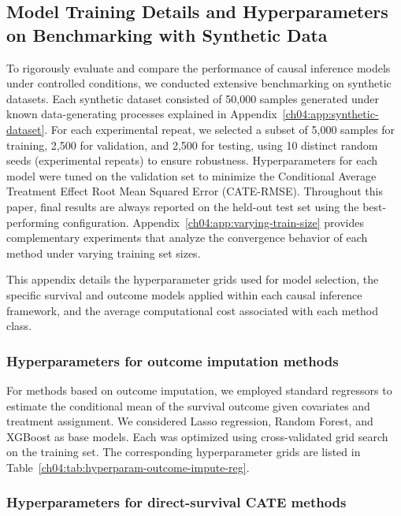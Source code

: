 \subsection{Model Training Details and Hyperparameters on Benchmarking with Synthetic Data}
\label{ch04:app:method_settings}

To rigorously evaluate and compare the performance of causal inference models under controlled conditions, we conducted extensive benchmarking on synthetic datasets.
Each synthetic dataset consisted of 50,000 samples generated under known data-generating processes explained in Appendix~\ref{ch04:app:synthetic-dataset}.
For each experimental repeat, we selected a subset of 5,000 samples for training, 2,500 for validation, and 2,500 for testing, using 10 distinct random seeds (experimental repeats) to ensure robustness.
Hyperparameters for each model were tuned on the validation set to minimize the Conditional Average Treatment Effect Root Mean Squared Error (CATE-RMSE).
Throughout this paper, final results are always reported on the held-out test set using the best-performing configuration.
Appendix~\ref{ch04:app:varying-train-size} provides complementary experiments that analyze the convergence behavior of each method under varying training set sizes.

This appendix details the hyperparameter grids used for model selection, the specific survival and outcome models applied within each causal inference framework, and the average computational cost associated with each method class.


\subsubsection{Hyperparameters for outcome imputation methods}

For methods based on outcome imputation, we employed standard regressors to estimate the conditional mean of the survival outcome given covariates and treatment assignment.
We considered Lasso regression, Random Forest, and XGBoost as base models.
Each was optimized using cross-validated grid search on the training set.
The corresponding hyperparameter grids are listed in Table~\ref{ch04:tab:hyperparam-outcome-impute-reg}.







\subsubsection{Hyperparameters for direct-survival CATE methods}

